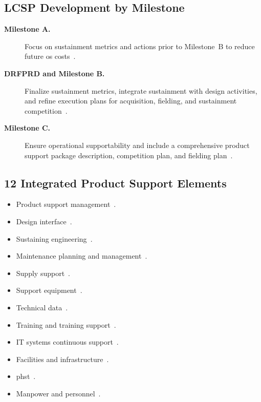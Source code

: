 \documentclass[../main.tex]{subfiles}
\begin{document}
\subsection{LCSP Development by Milestone}
\begin{description}
  \item[\textbf{Milestone A.}] Focus on sustainment metrics and actions prior to Milestone~B to reduce future \ac{os} costs~\autocite{edo-3-5-4-acquisition-logistics-2025}.
  \item[\textbf{DRFPRD and Milestone B.}] Finalize sustainment metrics, integrate sustainment with design activities, and refine execution plans for acquisition, fielding, and sustainment competition~\autocite{edo-3-5-4-acquisition-logistics-2025}.
  \item[\textbf{Milestone C.}] Ensure operational supportability and include a comprehensive product support package description, competition plan, and fielding plan~\autocite{edo-3-5-4-acquisition-logistics-2025}.
\end{description}

\subsection{12 Integrated Product Support Elements}
\begin{itemize}
  \item Product support management~\autocite{edo-3-5-4-acquisition-logistics-2025,DoDI5000-91}.
  \item Design interface~\autocite{edo-3-5-4-acquisition-logistics-2025,DoDI5000-91}.
  \item Sustaining engineering~\autocite{edo-3-5-4-acquisition-logistics-2025,DoDI5000-91}.
  \item Maintenance planning and management~\autocite{edo-3-5-4-acquisition-logistics-2025,DoDI5000-91}.
  \item Supply support~\autocite{edo-3-5-4-acquisition-logistics-2025,DoDI5000-91}.
  \item Support equipment~\autocite{edo-3-5-4-acquisition-logistics-2025,DoDI5000-91}.
  \item Technical data~\autocite{edo-3-5-4-acquisition-logistics-2025,DoDI5000-91}.
  \item Training and training support~\autocite{edo-3-5-4-acquisition-logistics-2025,DoDI5000-91}.
  \item IT systems continuous support~\autocite{DoDI5000-91}.
  \item Facilities and infrastructure~\autocite{edo-3-5-4-acquisition-logistics-2025,DoDI5000-91}.
  \item \ac{phst}~\autocite{edo-3-5-4-acquisition-logistics-2025,DoDI5000-91}.
  \item Manpower and personnel~\autocite{edo-3-5-4-acquisition-logistics-2025,DoDI5000-91}.
\end{itemize}
\end{document}
